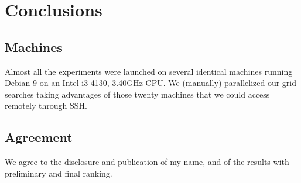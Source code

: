 \section{Conclusions}



\subsection{Machines}
Almost all the experiments were launched on several identical machines running Debian 9 on an Intel i3-4130, 3.40GHz CPU. We (manually) parallelized our grid searches taking advantages of those twenty machines that we could access remotely through SSH.
 
\subsection{Agreement}
We agree to the disclosure and publication of my name, and of the results with preliminary and final ranking.


